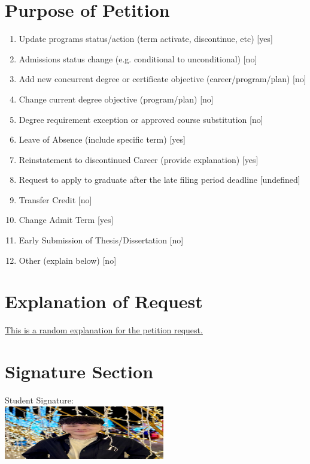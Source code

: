 \documentclass[a4paper,12pt]{article}
\begin{document}
\section*{Purpose of Petition}
\begin{enumerate}
    \item Update programs status/action (term activate, discontinue, etc) \hfill [yes]
    \item Admissions status change (e.g. conditional to unconditional) \hfill [no]
    \item Add new concurrent degree or certificate objective (career/program/plan) \hfill [no]
    \item Change current degree objective (program/plan) \hfill [no]
    \item Degree requirement exception or approved course substitution \hfill [no]
    \item Leave of Absence (include specific term) \hfill [yes]
    \item Reinstatement to discontinued Career (provide explanation) \hfill [yes]
    \item Request to apply to graduate after the late filing period deadline \hfill [undefined]
    \item Transfer Credit \hfill [no]
    \item Change Admit Term \hfill [yes]
    \item Early Submission of Thesis/Dissertation \hfill [no]
    \item Other (explain below) \hfill [no]
\end{enumerate}

\section*{Explanation of Request}
\begin{flushleft}
\underline{\hspace{15cm} This is a random explanation for the petition request.} \\
\end{flushleft}

\section*{Signature Section}
Student Signature: \\
\includegraphics[width=7cm]{signature.png}
\end{document}
